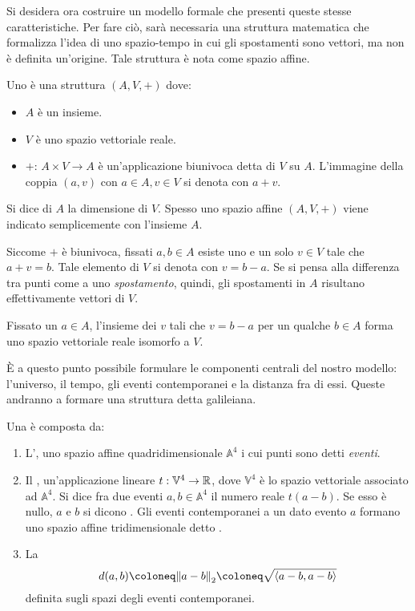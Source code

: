 Si desidera ora costruire un modello formale che presenti queste stesse caratteristiche. Per fare ciò, sarà necessaria una struttura matematica che formalizza l'idea di uno spazio-tempo in cui gli spostamenti sono vettori, ma non è definita un'origine. Tale struttura è nota come spazio affine.
\begin{definition}
  Uno  è una struttura $(A,V,+)$ dove:
  \begin{itemize}
    \item $A$ è un insieme.
    \item $V$ è uno spazio vettoriale reale.
    \item $+:\, A\times V \to A$ è un'applicazione biunivoca detta  di $V$ su $A$. L'immagine della coppia $(a,v)$ con $a \in  A, v \in V$ si denota con $a+v$.
  \end{itemize}
  Si dice  di $A$ la dimensione di $V$. Spesso uno spazio affine $(A, V, +)$ viene indicato semplicemente con l'insieme $A$.
\end{definition}
\begin{remark}
  Siccome $+$ è biunivoca, fissati $a,b \in A$ esiste uno e un solo $v \in V$ tale che $a + v = b$. Tale elemento di $V$ si denota con $v = b - a$. Se si pensa alla differenza tra punti come a uno \emph{spostamento}, quindi, gli spostamenti in $A$ risultano effettivamente vettori di $V$.
\end{remark}
\begin{remark}
Fissato un $a \in A$, l'insieme dei $v$ tali che $v = b - a$ per un qualche $b \in A$ forma uno spazio vettoriale reale isomorfo a $V$.
\end{remark}

È a questo punto possibile formulare le componenti centrali del nostro modello: l'universo, il tempo, gli eventi contemporanei e la distanza fra di essi. Queste andranno a formare una struttura detta galileiana.
\begin{definition}
  Una  è composta da:
  \begin{enumerate}
    \item L', uno spazio affine quadridimensionale $\mathbb{A}^4$ i cui punti sono detti \emph{eventi}. 
    \item Il , un'applicazione lineare $t:\mathbb{V}^4 \to \mathbb{R}$, dove $\mathbb{V}^4$ è lo spazio vettoriale associato ad $\mathbb{A}^4$. Si dice  fra due eventi $a,b \in \mathbb{A}^4$ il numero reale $t(a-b)$. Se esso è nullo, $a$ e $b$ si dicono . Gli eventi contemporanei a un dato evento $a$ formano uno spazio affine tridimensionale detto .
    \item La  \begin{equation}
    d(a,b) \defeq \norm{a-b}_2 \defeq \sqrt{\ev{a-b,a-b}}  
    \end{equation}
    definita sugli spazi degli eventi contemporanei.
  \end{enumerate}
\end{definition}

